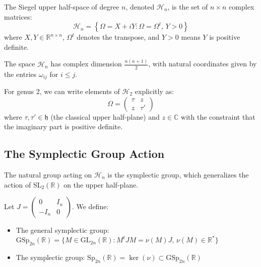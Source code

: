 \begin{definition}
\label{def:siegel_space}
The Siegel upper half-space of degree $n$, denoted $\mathcal{H}_n$, is the set of $n \times n$ complex matrices:
\begin{equation}
\mathcal{H}_n = \left\{ \Omega = X + iY : \Omega = \Omega^t, \, Y > 0 \right\}
\label{eq:siegel_space}
\end{equation}
where $X, Y \in \mathbb{R}^{n \times n}$, $\Omega^t$ denotes the transpose, and $Y > 0$ means $Y$ is positive definite.
\end{definition}

\begin{remark}
The space $\mathcal{H}_n$ has complex dimension $\frac{n(n+1)}{2}$, with natural coordinates given by the entries $\omega_{ij}$ for $i \leq j$.
\end{remark}

For genus 2, we can write elements of $\mathcal{H}_2$ explicitly as:
\begin{equation}
\Omega = \begin{pmatrix} \tau & z \\ z & \tau' \end{pmatrix}
\label{eq:genus2_matrix}
\end{equation}
where $\tau, \tau' \in \mathfrak{h}$ (the classical upper half-plane) and $z \in \mathbb{C}$ with the constraint that the imaginary part is positive definite.

\subsection{The Symplectic Group Action}

The natural group acting on $\mathcal{H}_n$ is the symplectic group, which generalizes the action of $\mathrm{SL}_2(\mathbb{R})$ on the upper half-plane.

\begin{definition}
\label{def:symplectic_groups}
Let $J = \begin{pmatrix} 0 & I_n \\ -I_n & 0 \end{pmatrix}$. We define:
\begin{itemize}
\item The general symplectic group: $\mathrm{GSp}_{2n}(\mathbb{R}) = \{M \in \mathrm{GL}_{2n}(\mathbb{R}) : M^t J M = \nu(M) J, \, \nu(M) \in \mathbb{R}^*\}$
\item The symplectic group: $\mathrm{Sp}_{2n}(\mathbb{R}) = \ker(\nu) \subset \mathrm{GSp}_{2n}(\mathbb{R})$
\end{itemize}
\end{definition}

